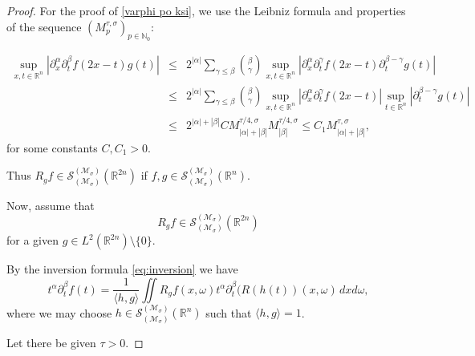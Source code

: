 \documentclass[10pt,a4paper]{amsart}
\begin{document}
\begin{proof}


For the proof of  \eqref{varphi po ksi}, we use the Leibniz formula
and properties of the sequence $(M_{p}^{\tau,\sigma})_{p\in\mathbb N_0}$:

\begin{eqnarray*}
 \sup_{x,t \in \mathbb{R}^n} |\partial^\alpha _x \partial^\beta _t   f(2x-t) g (t)|
& \leq &
 2^{|\alpha|} \sum_{\gamma \leq \beta}
  \binom{\beta}{\gamma} 
\sup_{x,t \in \mathbb{R}^n} |\partial^{\alpha} _x \partial^{\gamma} _t  f (2x - t)
 \partial^{\beta - \gamma} _t g  (t)|
\\
& \leq & 2^{|\alpha| }  \sum_{\gamma \leq \beta}
  \binom{\beta}{\gamma} 
\sup_{x,t \in \mathbb{R}^n}
| \partial^{\alpha} _x \partial^{\gamma} _t  f (2x - t)|
\sup_{t \in \mathbb{R}^n} |\partial^{\beta - \gamma} _t g  (t)|
\\
& \leq & 2^{|\alpha| +|\beta|} 
C M^{\tau/4,\sigma}_{|\alpha |  +|\beta|}  
M^{\tau/4,\sigma}_{|\beta|} 
\leq  C_1 M^{\tau,\sigma}_{|\alpha |  +|\beta|}, 
\end{eqnarray*}
for some constants $C, C_1 > 0 $.

Thus $ R_g f \in \mathcal S_{(\mathcal{M}_\sigma )}^{(\mathcal{M}_\sigma)} (\mathbb R^{2n}) $ if  $f,g \in    \mathcal S_{(\mathcal{M}_\sigma )}^{(\mathcal{M}_\sigma)} (\mathbb R^{n}) .$


Now, assume that 
\begin{equation} \label{eq:RinGSspace}
R_g f \in  
\mathcal S_{(\mathcal{M}_\sigma )}^{(\mathcal{M}_\sigma)} (\mathbb R^{2n}) 
\end{equation}
for a given $g \in L^2 (\mathbb R^{2n}) \setminus \{ 0\}$.

By the inversion formula \eqref{eq:inversion}
we have
\begin{equation} \label{eq:term-for-estimate}
t^\alpha \partial^\beta _t f (t) = \frac{1}{\langle h, g \rangle} 
\iint R_{g} f (x, \omega)
t^\alpha \partial^\beta _t (R (h (t)) (x, \omega)\, dx d\omega,
\end{equation}
where we may choose $h \in \mathcal S_{(\mathcal{M}_\sigma )}^{(\mathcal{M}_\sigma)} (\mathbb R^{n})$ such that 
$\langle h, g \rangle = 1$.

Let there be given $\tau >0$.


\end{proof}
\end{document}
